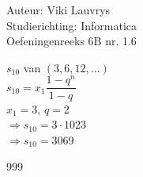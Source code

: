 \documentclass[a4paper]{article}
\begin{document}
  
\noindent \large Auteur: Viki	Lauvrys \\
\noindent \large Studierichting: Informatica\\
\noindent \large Oefeningenreeks 6B nr. 1.6\\

\medskip

\normalsize

$s_{10} $ van $ (3, 6, 12, ...) $ \\

$s_{10} = x_1 \dfrac{1 - q^n}{1 - q}$ \\

$x_1 = 3$, $q = 2 $ \\

$\Rightarrow s_{10} = 3\cdot 1023 $\\

$\Rightarrow s_{10} = 3069$\\

\begin{thebibliography}{999}
\end{thebibliography}
\end{document}
